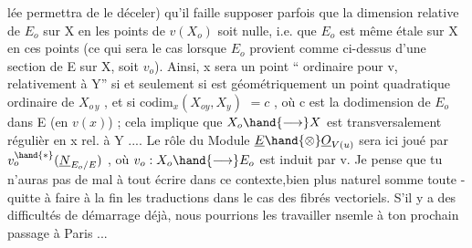 lée permettra de le déceler) qu'il faille supposer parfois que la dimension
relative de $E_{o}$ sur X en les points de $v(X_{o})$ soit nulle, i.e. que $E_{o}$ est
même étale sur X en ces points (ce qui sera le cas lorsque $E_{o}$ provient comme
ci-dessus d'une section de E sur X, soit $v_{o}$). Ainsi, x sera un point
``  ordinaire pour v, relativement à Y'' si et seulement si    est
géométriquement un point quadratique ordinaire de $X_{o\,y}$ , et si $\mathrm{codim}_{x}(X_{oy},X_{y})$
$= c$ , où c est la dodimension de $E_{o}$ dans E (en $v(x)$) ; cela implique que
$X_{o}\hand{\longrightarrow} X$ est  transversalement régulièr en x rel. à Y .... Le rôle du Module
$\underline{E}\hand{\otimes}\underline{O}_{V(u)}$ sera ici joué par $v_{o}^{\hand{*}}(\underline{N}_{E_{o}/E})$ , où $v_{o}:X_{o}\hand{\longrightarrow} E_{o}$ est induit par v. Je
pense que tu n'auras pas de mal à tout écrire dans ce contexte,bien plus
naturel somme toute - quitte à faire à la fin les traductions dans le cas
des fibrés vectoriels. S'il y a des difficultés de démarrage déjà, nous
pourrions les travailler nsemle à ton prochain passage à Paris ... 
